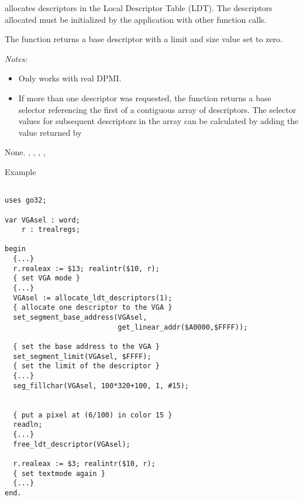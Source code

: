 { allocates  descriptors in the 
Local Descriptor Table (LDT).
The descriptors allocated must be initialized by the application with
other function calls.

The function returns a base descriptor with a limit and size value set to 
zero.

{\em Notes:}
\begin{itemize}
\item Only works with real DPMI.
\item If more than one descriptor was requested, the function returns a base
selector referencing the first of a contiguous array of descriptors. The
selector values for subsequent descriptors in the array can be
calculated by adding the value returned by
\end{itemize}
}{None.}{
,
,
,
,
}
\begin{FPCList}
\item[Example]
\begin{verbatim}

uses go32;

var VGAsel : word;
    r : trealregs;

begin
  {...}
  r.realeax := $13; realintr($10, r); 
  { set VGA mode }
  {...}
  VGAsel := allocate_ldt_descriptors(1); 
  { allocate one descriptor to the VGA }
  set_segment_base_address(VGAsel, 
                           get_linear_addr($A0000,$FFFF)); 

  { set the base address to the VGA }
  set_segment_limit(VGAsel, $FFFF); 
  { set the limit of the descriptor }
  {...}
  seg_fillchar(VGAsel, 100*320+100, 1, #15);


  { put a pixel at (6/100) in color 15 }
  readln;
  {...}
  free_ldt_descriptor(VGAsel);

  r.realeax := $3; realintr($10, r); 
  { set textmode again }
  {...}
end.
\end{verbatim}
\end{FPCList}

